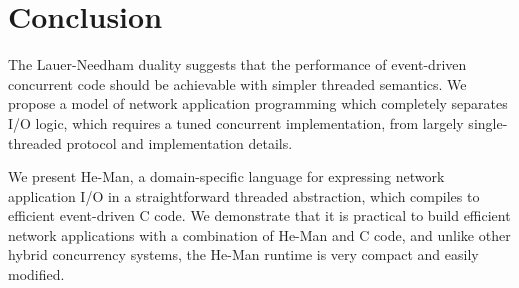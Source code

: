 \documentclass[preprint]{sigplanconf}
\begin{document}
\section{Conclusion}

The Lauer-Needham duality suggests that the performance of event-driven
concurrent code should be achievable with simpler threaded semantics. We propose
a model of network application programming which completely separates I/O logic,
which requires a tuned concurrent implementation, from largely single-threaded
protocol and implementation details. 

We present He-Man, a domain-specific language for expressing network application
I/O in a straightforward threaded abstraction, which compiles to efficient
event-driven C code. We demonstrate that it is practical to build efficient
network applications with a combination of He-Man and C code, and unlike other
hybrid concurrency systems, the He-Man runtime is very compact and easily
modified.

{}

\end{document}

